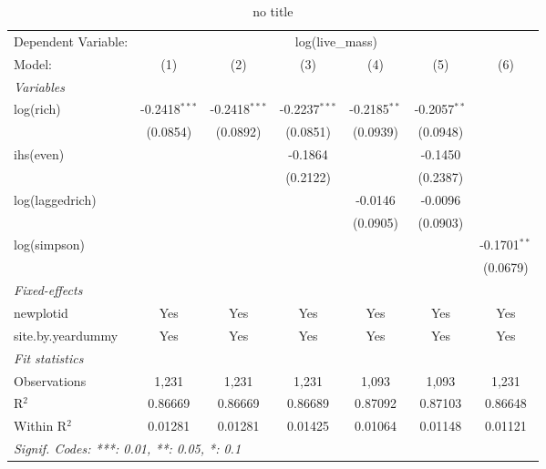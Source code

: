 
\begin{table}[htbp]
   \caption{no title}
   \centering
   \begin{tabular}{lcccccc}
      \tabularnewline \midrule \midrule
      Dependent Variable: & \multicolumn{6}{c}{log(live\_mass)}\\
      Model:            & (1)             & (2)             & (3)             & (4)            & (5)            & (6)\\  
      \midrule
      \emph{Variables}\\
      log(rich)         & -0.2418$^{***}$ & -0.2418$^{***}$ & -0.2237$^{***}$ & -0.2185$^{**}$ & -0.2057$^{**}$ &   \\   
                        & (0.0854)        & (0.0892)        & (0.0851)        & (0.0939)       & (0.0948)       &   \\   
      ihs(even)         &                 &                 & -0.1864         &                & -0.1450        &   \\   
                        &                 &                 & (0.2122)        &                & (0.2387)       &   \\   
      log(laggedrich)   &                 &                 &                 & -0.0146        & -0.0096        &   \\   
                        &                 &                 &                 & (0.0905)       & (0.0903)       &   \\   
      log(simpson)      &                 &                 &                 &                &                & -0.1701$^{**}$\\   
                        &                 &                 &                 &                &                & (0.0679)\\   
      \midrule
      \emph{Fixed-effects}\\
      newplotid         & Yes             & Yes             & Yes             & Yes            & Yes            & Yes\\  
      site.by.yeardummy & Yes             & Yes             & Yes             & Yes            & Yes            & Yes\\  
      \midrule
      \emph{Fit statistics}\\
      Observations      & 1,231           & 1,231           & 1,231           & 1,093          & 1,093          & 1,231\\  
      R$^2$             & 0.86669         & 0.86669         & 0.86689         & 0.87092        & 0.87103        & 0.86648\\  
      Within R$^2$      & 0.01281         & 0.01281         & 0.01425         & 0.01064        & 0.01148        & 0.01121\\  
      \midrule \midrule
      \multicolumn{7}{l}{\emph{Signif. Codes: ***: 0.01, **: 0.05, *: 0.1}}\\
   \end{tabular}
\end{table}


